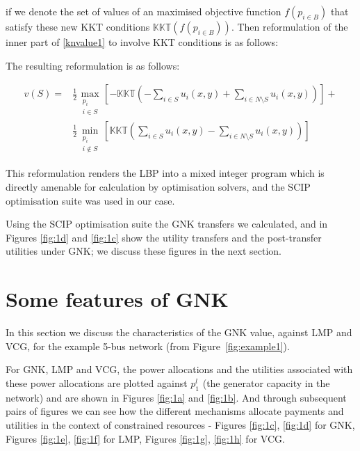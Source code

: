 if we denote the set of values of an maximised objective function $f(p_{i\in B})$ that satisfy these new KKT conditions $\mathbb{KKT}(f(p_{i\in B}))$.
Then reformulation of the inner part of \eqref{knvalue1} to involve KKT conditions is as follows:

The resulting reformulation is as follows:

\begin{equation}
\label{optimization_eq1}
\begin{aligned}
v(S) =
&\frac{1}{2}\max_{\substack{p_i \\ i\in S}}   \left[-\mathbb{KKT}\left(-\sum_{i\in S} u_i(x,y) + \sum_{i\in N\setminus S}u_i(x,y)\right)\right] +\\
&\frac{1}{2}\min_{\substack{p_i \\ i\notin S}}\left[\mathbb{KKT}\left(\sum_{i\in S} u_i(x,y) - \sum_{i\in N\setminus S}u_i(x,y)\right)\right]
\end{aligned}
\end{equation}

This reformulation renders the LBP into a mixed integer program which is directly amenable for calculation by optimisation solvers, and the SCIP optimisation suite was used in our case.

Using the SCIP optimisation suite the GNK transfers we calculated, and in Figures \ref{fig:1d} and \ref{fig:1c} show the utility transfers and the post-transfer utilities under GNK; we discuss these figures in the next section.


\section{Some features of GNK}\label{sec:features}

In this section we discuss the characteristics of the GNK value, against LMP and VCG, for the example 5-bus network (from Figure~\ref{fig:example1}).

For GNK, LMP and VCG, the power allocations and the utilities associated with these power allocations are plotted against $p_1^l$ (the generator capacity in the network) and are shown in Figures \ref{fig:1a} and \ref{fig:1b}.
And through subsequent pairs of figures we can see how the different mechanisms allocate payments and utilities in the context of constrained resources - Figures \ref{fig:1c}, \ref{fig:1d} for GNK, Figures \ref{fig:1e}, \ref{fig:1f} for LMP, Figures \ref{fig:1g}, \ref{fig:1h} for VCG.

\iffigures
% 

\fi

